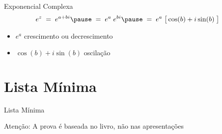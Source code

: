 \begin{frame}{Exponencial Complexa}
  \[
    e^{z}
    \;=\; e^{a+bi}                                   \pause
    \;=\; e^a\; e^{bi}                               \pause
    \;=\; e^a \; \big[ \cos(b) + i\sin(b)\; \big]
  \]
  \pause
  \vspace{-\baselineskip}
  \begin{itemize}[<+->]
    \item \(e^a\)                \tabto{35mm} crescimento ou decrescimento
    \item \(\cos(b) + i\sin(b)\) \tabto{35mm} oscilação
  \end{itemize}
\end{frame}

\section{Lista Mínima}

\begin{frame}{Lista Mínima}

  \vfill
  Atenção: A prova é baseada no livro, não nas apresentações
\end{frame}


